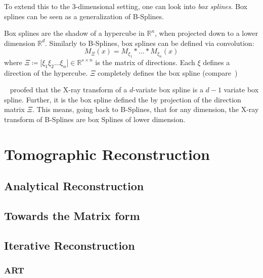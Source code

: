 To extend this to the \(3\)-dimensional setting, one can look into \textit{box splines}. Box splines
can be seen as a generalization of B-Splines.

\begin{definition}
	Box splines are the shadow of a hypercube in \(\mathbb{R}^n\), when projected down to a
	lower dimension \(\mathbb{R}^d\). Similarly to B-Splines, box splines can be defined via
	convolution:
	\begin{equation}
		M_\Xi(x) = M_{\xi_1} * \dots * M_{\xi_n}(x)
	\end{equation}
	where \(\Xi \coloneq \mathopen[ \xi_1 \xi_2 \dots \xi_n \mathclose] \in \mathbb{R}^{s \times n}\)
	is the matrix of directions. Each \(\xi\) defines a direction of the hypercube.
	\(\Xi\) completely defines the box spline (compare~\cite{de_boor_box_1993})
\end{definition}

\citeauthor*{entezari_box_2012}~\cite{entezari_box_2012} proofed that the X-ray transform of a
\(d\)-variate box spline is a \(d - 1\) variate box spline. Further, it is the box spline defined
the by projection of the direction matrix \(\Xi\). This means, going back to B-Splines, that for any
dimension, the X-ray transform of B-Splines are box Splines of lower dimension.

\chapter{Tomographic Reconstruction}\label{chap:tomographic_reconstruction}

\section{Analytical Reconstruction}\label{sec:analytical_reconstruction}

\section{Towards the Matrix form}\label{sec:matrix_formulation}

\section{Iterative Reconstruction}\label{sec:iterative_reconstruction}

\subsection{ART}\label{subsec:algebraic_reconstruction_technique}


